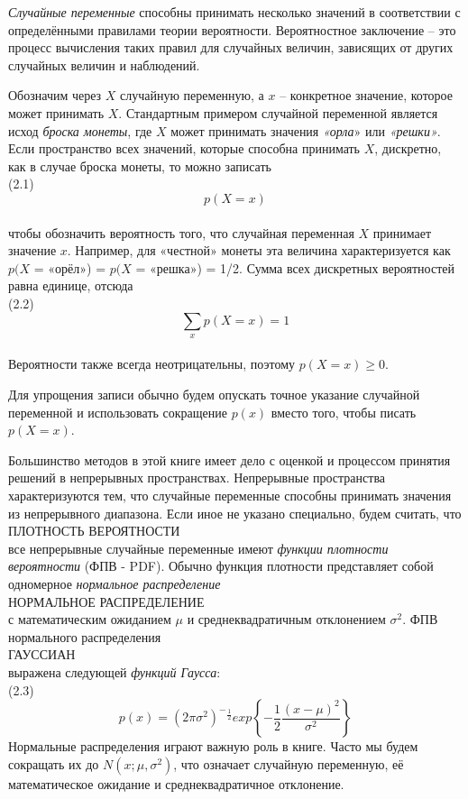 \documentclass[10pt,a4paper]{article}
\begin{document}
\textit{Случайные переменные} способны принимать несколько значений в соответствии с определёнными правилами теории вероятности. 
Вероятностное заключение – это процесс вычисления таких правил для случайных величин, зависящих от других случайных величин и наблюдений.
 
Обозначим через $X$ случайную переменную, а $x$ – конкретное значение, которое может принимать $X$. Стандартным примером случайной переменной является исход \textit{броска монеты}, где $X$ может принимать значения \textit{«орла}» или \textit{«решки»}. Если пространство всех значений, которые способна принимать $X$, дискретно, как в случае броска монеты, то можно записать\\

(2.1) $$p(X = x)$$\\
чтобы обозначить вероятность того, что случайная переменная  $X$ принимает значение $x$. Например, для «честной» монеты эта величина характеризуется как $p(X$ = «орёл») = $p(X$ = «решка») = 1/2. Сумма всех дискретных вероятностей равна единице, отсюда \\

(2.2) $$\sum_{x}p(X = x) = 1$$\\
Вероятности также всегда неотрицательны, поэтому $p(X = x)\ge0$.

Для упрощения записи обычно будем опускать точное указание случайной переменной и использовать сокращение $p(x)$ вместо того, чтобы писать $p(X = x)$.

Большинство методов в этой книге имеет дело с оценкой и процессом принятия решений в непрерывных пространствах. Непрерывные пространства характеризуются тем, что случайные переменные способны принимать значения из непрерывного диапазона.
Если иное не указано специально, будем считать, что\\
ПЛОТНОСТЬ ВЕРОЯТНОСТИ\\ 
все непрерывные случайные переменные имеют \textit{функции плотности вероятности} (ФПВ - PDF). Обычно функция плотности представляет собой одномерное \textit{нормальное распределение}\\
НОРМАЛЬНОЕ РАСПРЕДЕЛЕНИЕ\\ 
с математическим ожиданием $\mu$ и среднеквадратичным отклонением $\sigma^2$. ФПВ нормального распределения\\
ГАУССИАН\\ 
выражена следующей \textit{функций Гаусса}:\\

(2.3)
 $$p(x)=(2\pi\sigma^2)^-{}^\frac{1}{2}exp\left\lbrace -\frac{1}{2}\frac{(x-\mu)^2}{\sigma^2}\right\rbrace $$
Нормальные распределения играют важную роль в книге. Часто мы будем сокращать их до 
$N(x;\mu,\sigma^2)$, что означает случайную переменную, её математическое ожидание и среднеквадратичное отклонение.
 
\end{document}
